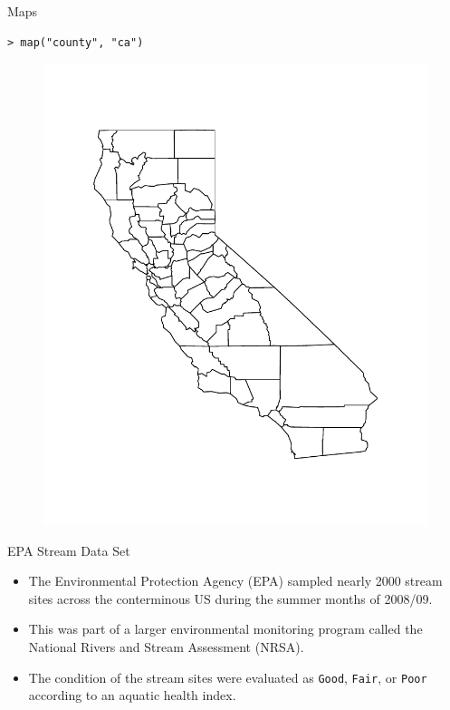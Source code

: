 \documentclass[10pt]{beamer}
\begin{document}
\begin{frame}[fragile]{Maps}
\begin{verbatim}
> map("county", "ca")
\end{verbatim}
\begin{figure}[htbp]
\centering
\includegraphics[scale=0.4]{figure/cali2.pdf}
\end{figure}
\end{frame}

\begin{frame}{EPA Stream Data Set}
\begin{itemize}
\item The Environmental Protection Agency (EPA) sampled nearly 2000 stream sites across the conterminous US during the summer months of 2008/09.
\vspace{5pt}
\item This was part of a larger environmental monitoring program called the National Rivers and Stream Assessment (NRSA).
\vspace{5pt}
\item The condition of the stream sites were evaluated as \texttt{Good}, \texttt{Fair}, or \texttt{Poor} according to an aquatic health index. 
\end{itemize}
\end{frame}
\end{document}
